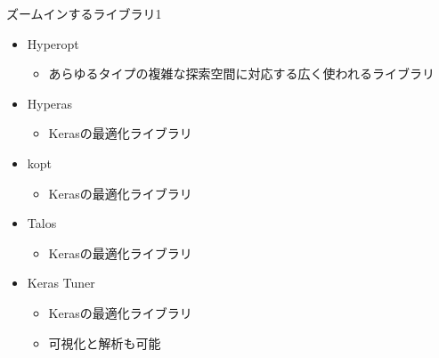 \documentclass[aspectratio=169, dvipdfmx, 14pt, xcolor={svgnames,dvipsnames}]{beamer}
\def\tightlist{\itemsep1pt\parskip0pt\parsep0pt}
\begin{document}
\begin{frame}{\quad ズームインするライブラリ1}
  \begin{itemize}
    \tightlist
    \item
          Hyperopt

          \begin{itemize}
            \tightlist
            \item
                  あらゆるタイプの複雑な探索空間に対応する広く使われるライブラリ
          \end{itemize}
    \item
          Hyperas

          \begin{itemize}
            \tightlist
            \item
                  Kerasの最適化ライブラリ
          \end{itemize}
    \item
          kopt

          \begin{itemize}
            \tightlist
            \item
                  Kerasの最適化ライブラリ
          \end{itemize}
    \item
          Talos

          \begin{itemize}
            \tightlist
            \item
                  Kerasの最適化ライブラリ
          \end{itemize}
    \item
          Keras Tuner

          \begin{itemize}
            \tightlist
            \item
                  Kerasの最適化ライブラリ
            \item
                  可視化と解析も可能
          \end{itemize}
  \end{itemize}
\end{frame}

\end{document}
